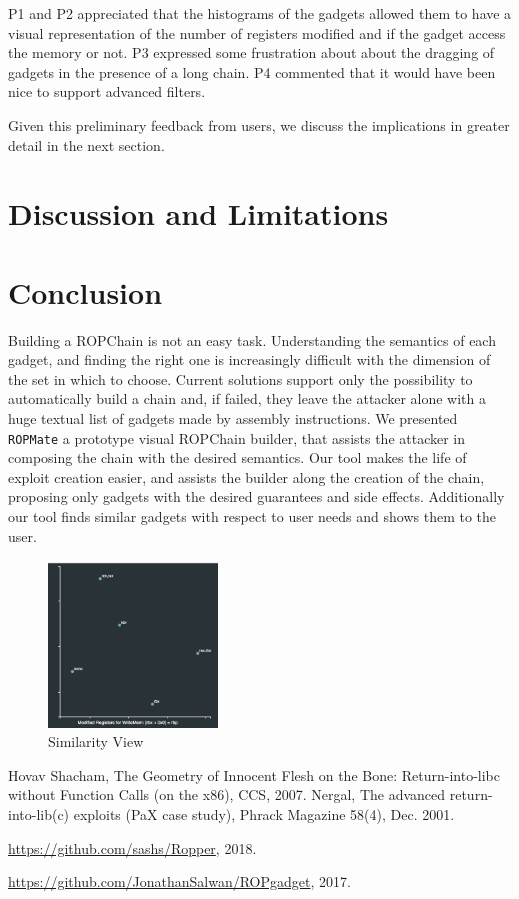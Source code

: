 \documentclass[twocolumn, 11pt]{article}
\begin{document}
P1 and P2 appreciated that the histograms of the gadgets allowed them to have a visual representation of the number of registers modified and if the gadget access the memory or not. P3 expressed some frustration about about the dragging of gadgets in the presence of a long chain. P4 commented that it would have been nice to support advanced filters.

Given this preliminary feedback from users, we discuss the implications in greater detail in the next section.

\section{Discussion and Limitations}

\section{Conclusion}
Building a ROPChain is not an easy task. Understanding the semantics of each gadget, and finding the right one is increasingly difficult with the dimension of the set in which to choose. Current solutions support only the possibility to automatically build a chain and, if failed, they leave the attacker alone with a huge textual list of gadgets made by assembly instructions.
We presented \texttt{ROPMate} a prototype visual ROPChain builder, that assists the attacker in composing the chain with the desired semantics. Our tool makes the life of exploit creation easier, and assists the builder along the creation of the chain, proposing only gadgets with the desired guarantees and side effects. Additionally our tool finds similar gadgets with respect to user needs and shows them to the user.


\begin{figure}[htb]
\centering
 \includegraphics[width=0.4\textwidth]{mds}
 \caption{Similarity View}\label{fig:mds}
\end{figure}



\begin{thebibliography}{99}
    Hovav Shacham,
    The Geometry of Innocent Flesh on the Bone: Return-into-libc without Function Calls (on the x86),
    CCS,
    2007.
    Nergal,
    The advanced return-into-lib(c) exploits (PaX case study),
    Phrack Magazine 58(4),
    Dec. 2001.

     \url{https://github.com/sashs/Ropper},
    2018.

    \url{https://github.com/JonathanSalwan/ROPgadget},
    2017.

\end{thebibliography}
\end{document}
